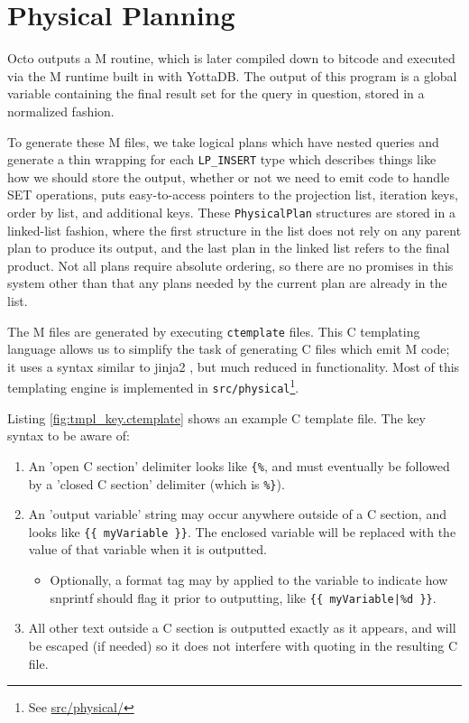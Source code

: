 \documentclass[]{article}
\def\code#1{\texttt{#1}}
\newcommand{\gitlab}[1]{\footnote{See \href{https://gitlab.com/YottaDB/DBMS/YDBOcto/blob/master/#1}{#1}}}
\begin{document}
\section{Physical Planning} \label{sec:physical}

Octo outputs a M routine, which is later compiled down to bitcode and executed via the M runtime built in with YottaDB.
The output of this program is a global variable containing the final result set for the query in question, stored in a normalized fashion.

To generate these M files, we take logical plans which have nested queries and generate a thin wrapping for each \code{LP\_INSERT} type which describes things like how we should store the output, whether or not we need to emit code to handle SET operations, puts easy-to-access pointers to the projection list, iteration keys, order by list, and additional keys.
These \code{PhysicalPlan} structures are stored in a linked-list fashion, where the first structure in the list does not rely on any parent plan to produce its output, and the last plan in the linked list refers to the final product.
Not all plans require absolute ordering, so there are no promises in this system other than that any plans needed by the current plan are already in the list.

The M files are generated by executing \code{ctemplate} files.
This C templating language allows us to simplify the task of generating C files which emit M code; it uses a syntax similar to jinja2 \cite{jinja2}, but much reduced in functionality.
Most of this templating engine is implemented in \code{src/physical}\gitlab{src/physical/}.

Listing \ref{fig:tmpl_key.ctemplate} shows an example C template file.
The key syntax to be aware of:

\begin{enumerate}
	\item An 'open C section' delimiter looks like \code{\{\%}, and must eventually be followed by a 'closed C section' delimiter (which is \code{\%\}}).
	\item An 'output variable' string may occur anywhere outside of a C section, and looks like \code{\{\{ myVariable \}\}}. The enclosed variable will be replaced with the value of that variable when it is outputted.
	\begin{itemize}
		\item Optionally, a format tag may by applied to the variable to indicate how snprintf should flag it prior to outputting, like \code{\{\{ myVariable|\%d \}\}}.
	\end{itemize}
	\item All other text outside a C section is outputted exactly as it appears, and will be escaped (if needed) so it does not interfere with quoting in the resulting C file.
\end{enumerate}
\end{document}
